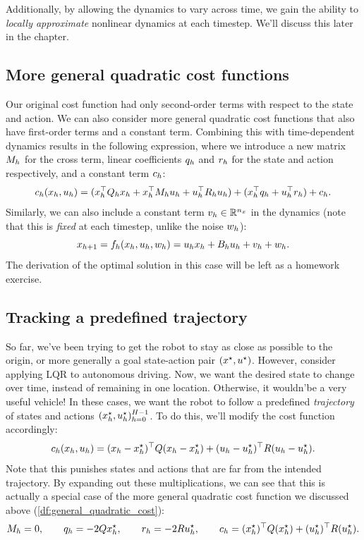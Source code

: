 \documentclass[../main/main]{subfiles}
\begin{document}
Additionally, by allowing the dynamics to vary across time,
we gain the ability to \emph{locally approximate} nonlinear dynamics at each timestep.
We'll discuss this later in the chapter.

\subsection[General quadratic cost]{More general quadratic cost functions}

Our original cost function had only second-order terms with respect to the state and action. We can also consider more general quadratic cost functions that also have first-order terms and a constant term. Combining this with
time-dependent dynamics results in the following expression, where we introduce a new matrix $M_h$ for the cross term, linear coefficients $q_h$ and $r_h$ for the state and action respectively, and a constant term $c_h$:
\begin{equation}
    c_h(x_h, u_h) = ( x_h^\top Q_h x_h + x_h^\top M_h u_h + u_h^\top R_h u_h ) + (x_h^\top q_h + u_h^\top r_h) + c_h.
    \label{df:general_quadratic_cost}
\end{equation}
Similarly, we can also include a constant term $v_h \in \mathbb{R}^{n_x}$ in the dynamics (note that this is \emph{fixed} at each timestep, unlike the noise $w_h$):
\[
    x_{h+1} = f_h(x_h, u_h, w_h) = u_h x_h + B_h u_h + v_h + w_h.
\]
The derivation of the optimal solution in this case will be left as a homework exercise.


\subsection{Tracking a predefined trajectory}

So far, we've been trying to get the robot to stay as close as possible to the origin, or more generally a goal state-action pair $(x^\star, u^\star)$. However, consider applying LQR to autonomous driving. Now, we want the desired state to change over time, instead of remaining in one location. Otherwise, it wouldn'\hi be a very useful vehicle!
In these cases, we want the robot to follow a predefined \emph{trajectory} of
states and actions $(x_h^\star, u_h^\star)_{h=0}^{H-1}$. To do this, we'll modify the cost function accordingly:
\[
    c_h(x_h, u_h) = (x_h - x^\star_h)^\top Q (x_h - x^\star_h) + (u_h - u^\star_h)^\top R (u_h - u^\star_h).
\]
Note that this punishes states and actions that are far from the intended trajectory. By expanding out these multiplications, we can see that this is actually a special case of the more general quadratic cost function we discussed above (\autoref{df:general_quadratic_cost}): \[
    M_h = 0, \qquad q_h = -2Q x^\star_h, \qquad r_h = -2R u^\star_h, \qquad c_h = (x^\star_h)^\top Q (x^\star_h) + (u^\star_h)^\top R (u^\star_h).
\]
\end{document}
